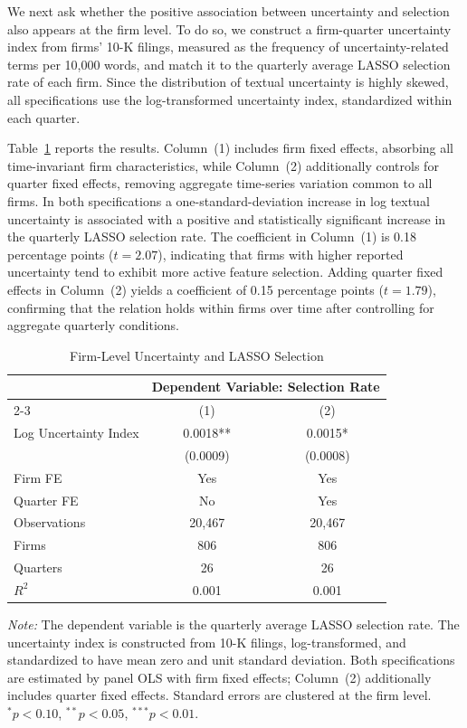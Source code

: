 We next ask whether the positive association between uncertainty and selection also appears at the firm level. To do so, we construct a firm-quarter uncertainty index from firms' 10-K filings, measured as the frequency of uncertainty-related terms per 10,000 words, and match it to the quarterly average LASSO selection rate of each firm. Since the distribution of textual uncertainty is highly skewed, all specifications use the log-transformed uncertainty index, standardized within each quarter.

Table~\ref{tab:uncertainty_selection} reports the results. Column~(1) includes firm fixed effects, absorbing all time-invariant firm characteristics, while Column~(2) additionally controls for quarter fixed effects, removing aggregate time-series variation common to all firms. In both specifications a one-standard-deviation increase in log textual uncertainty is associated with a positive and statistically significant increase in the quarterly LASSO selection rate. The coefficient in Column~(1) is 0.18 percentage points ($t=2.07$), indicating that firms with higher reported uncertainty tend to exhibit more active feature selection. Adding quarter fixed effects in Column~(2) yields a coefficient of 0.15 percentage points ($t=1.79$), confirming that the relation holds within firms over time after controlling for aggregate quarterly conditions.
\begin{table}[H]
\centering
\caption{Firm-Level Uncertainty and LASSO Selection}
\label{tab:uncertainty_selection}

\begin{tabular}{lcc}
\toprule
& \multicolumn{2}{c}{Dependent Variable: Selection Rate} \\
\cmidrule(lr){2-3}
& (1) & (2) \\
\midrule
Log Uncertainty Index
    & 0.0018** & 0.0015* \\
    & (0.0009) & (0.0008) \\
\midrule
Firm FE
    & Yes & Yes \\
Quarter FE
    & No  & Yes \\
\midrule
Observations
    & 20,467 & 20,467 \\
Firms
    & 806 & 806 \\
Quarters
    & 26 & 26 \\
$R^2$
    & 0.001 & 0.001 \\
\bottomrule
\end{tabular}

\vspace{0.15cm}
\begin{minipage}{0.95\textwidth}
\footnotesize
\textit{Note:} The dependent variable is the quarterly average LASSO selection rate. The uncertainty index is constructed from 10-K filings, log-transformed, and standardized to have mean zero and unit standard deviation. Both specifications are estimated by panel OLS with firm fixed effects; Column~(2) additionally includes quarter fixed effects. Standard errors are clustered at the firm level. $^{*}p<0.10$, $^{**}p<0.05$, $^{***}p<0.01$.
\end{minipage}
\end{table}

